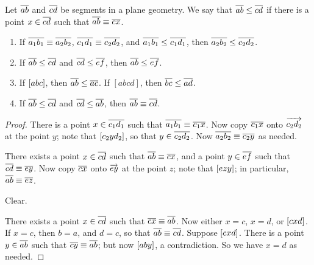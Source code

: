 \begin{dfn}
Let $\overline{ab}$ and $\overline{cd}$ be segments in a plane geometry. We say that $\overline{ab} \leq \overline{cd}$ if there is a point $x \in \overline{cd}$ such that $\overline{ab} \equiv \overline{cx}$.
\end{dfn}

\begin{prop} \mbox{}
\begin{enumerate}
\item If $\overline{a_1b_1} \equiv \overline{a_2b_2}$, $\overline{c_1d_1} \equiv \overline{c_2d_2}$, and $\overline{a_1b_1} \leq \overline{c_1d_1}$, then $\overline{a_2b_2} \leq \overline{c_2d_2}$.
\item If $\overline{ab} \leq \overline{cd}$ and $\overline{cd} \leq \overline{ef}$, then $\overline{ab} \leq \overline{ef}$.
\item If $[ a b c ]$, then $\overline{ab} \leq \overline{ac}$. If $[abcd]$, then $\overline{bc} \leq \overline{ad}$.
\item If $\overline{ab} \leq \overline{cd}$ and $\overline{cd} \leq \overline{ab}$, then $\overline{ab} \equiv \overline{cd}$.
\end{enumerate}
\end{prop}

\begin{proof}
\item There is a point $x \in \overline{c_1d_1}$ such that $\overline{a_1b_1} \equiv \overline{c_1x}$. Now copy $\overline{c_1x}$ onto $\overrightarrow{c_2d_2}$ at the point $y$; note that $[ c_2 y d_2 ]$, so that $y \in \overline{c_2d_2}$. Now $\overline{a_2b_2} \equiv \overline{c_2y}$ as needed.

\item There exists a point $x \in \overline{cd}$ such that $\overline{ab} \equiv \overline{cx}$, and a point $y \in \overline{ef}$ such that $\overline{cd} \equiv \overline{ey}$. Now copy $\overline{cx}$ onto $\overrightarrow{ey}$ at the point $z$; note that $[ e z y ]$; in particular, $\overline{ab} \equiv \overline{ez}$.

\item Clear.

\item There exists a point $x \in \overline{cd}$ such that $\overline{cx} \equiv \overline{ab}$. Now either $x = c$, $x = d$, or $[ c x d ]$. If $x = c$, then $b = a$, and $d = c$, so that $\overline{ab} \equiv \overline{cd}$. Suppose $[ c x d ]$. There is a point $y \in \overline{ab}$ such that $\overline{cy} \equiv \overline{ab}$; but now $[ a b y ]$, a contradiction. So we have $x = d$ as needed.
\end{proof}
